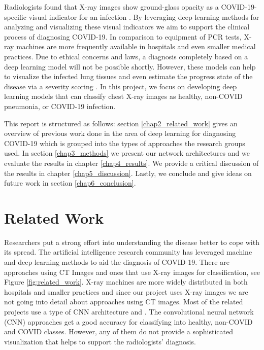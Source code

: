 \documentclass[conference]{IEEEtran}
\begin{document}
Radiologists found that X-ray images show ground-glass opacity as a COVID-19-specific visual indicator for an infection \cite{kong2020chest}. By leveraging deep learning methods for analyzing and visualizing these visual indicators we aim to support the clinical process of diagnosing COVID-19. In comparison to equipment of PCR tests, X-ray machines are more frequently available in hospitals and even smaller medical practices. Due to ethical concerns and laws, a diagnosis completely based on a deep learning model will not be possible shortly. However, these models can help to visualize the infected lung tissues and even estimate the progress state of the disease via a severity scoring \cite{warren2018severity}. In this project, we focus on developing deep learning models that can classify chest X-ray images as healthy, non-COVID pneumonia, or COVID-19 infection.

This report is structured as follows: section  \ref{chap2_related_work} gives an overview of previous work done in the area of deep learning for diagnosing COVID-19 which is grouped into the types of approaches the research groups used. In section \ref{chap3_methods} we present our network architectures and we evaluate the results in chapter \ref{chap4_results}. We provide a critical discussion of the results in chapter \ref{chap5_discussion}. Lastly, we conclude and give ideas on future work in section  \ref{chap6_conclusion}.

\label{chap2_related_work}
\section{Related Work}

Researchers put a strong effort into understanding the disease better to cope with its spread. The artificial intelligence research community has leveraged machine and deep learning methods to aid the diagnosis of COVID-19. There are approaches using CT Images \cite{li2020artificial} \cite{shan2020lung} \cite{gozes2020rapid} \cite{wang2020deep} \cite{song2020deep} \cite{huang2020serial} \cite{butt2020deep} and ones that use X-ray images for classification, see Figure \ref{fig:related_work}. X-ray machines are more widely distributed in both hospitals and smaller practices and since our project uses X-ray images we are not going into detail about approaches using CT images. 
Most of the related projects use a type of CNN architecture \cite{wang2020covid}  \cite{narin2020automatic} \cite{sharma2020covid} \cite{abbas2020classification} \cite{hemdan2020covidx} \cite{ghoshal2020estimating} \cite{hall2020finding} and \cite{farooq2020covid}. The convolutional neural network (CNN) approaches get a good accuracy for classifying into healthy, non-COVID and COVID classes. However, any of them do not provide a sophisticated visualization that helps to support the radiologists' diagnosis.
\end{document}
